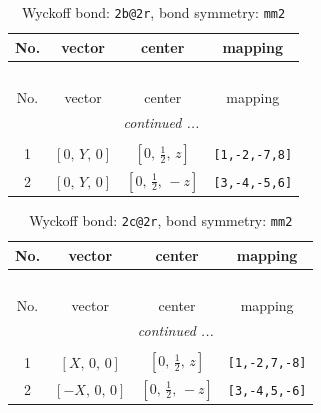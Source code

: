 \documentclass[fleqn,8pt]{jsarticle}
\begin{document}
\renewcommand{\arraystretch}{1.2}
\begin{longtable}{cccc}
\caption{Wyckoff bond: {\tt 2b@2r}, bond symmetry: {\tt mm2}}
 \\
 \hline \hline
No. & vector & center & mapping \\ \hline \endfirsthead

\multicolumn{3}{l}{\tablename\ \thetable{}} \\
 \hline \hline
No. & vector & center & mapping \\ \hline \endhead

 \hline \hline
\multicolumn{3}{r}{\footnotesize\it continued ...} \\ \endfoot

 \hline \hline
\multicolumn{3}{r}{} \\ \endlastfoot

1 & $\left[ 0,\, Y,\, 0 \right]$ & $\left[ 0,\, \frac{1}{2},\, z \right]$ & {\tt [1,-2,-7,8]} \\ \hline
2 & $\left[ 0,\, Y,\, 0 \right]$ & $\left[ 0,\, \frac{1}{2},\, - z \right]$ & {\tt [3,-4,-5,6]} \\
\end{longtable}
\renewcommand{\arraystretch}{1.2}
\begin{longtable}{cccc}
\caption{Wyckoff bond: {\tt 2c@2r}, bond symmetry: {\tt mm2}}
 \\
 \hline \hline
No. & vector & center & mapping \\ \hline \endfirsthead

\multicolumn{3}{l}{\tablename\ \thetable{}} \\
 \hline \hline
No. & vector & center & mapping \\ \hline \endhead

 \hline \hline
\multicolumn{3}{r}{\footnotesize\it continued ...} \\ \endfoot

 \hline \hline
\multicolumn{3}{r}{} \\ \endlastfoot

1 & $\left[ X,\, 0,\, 0 \right]$ & $\left[ 0,\, \frac{1}{2},\, z \right]$ & {\tt [1,-2,7,-8]} \\ \hline
2 & $\left[ - X,\, 0,\, 0 \right]$ & $\left[ 0,\, \frac{1}{2},\, - z \right]$ & {\tt [3,-4,5,-6]} \\
\end{longtable}
\renewcommand{\arraystretch}{1.2}
\end{document}
